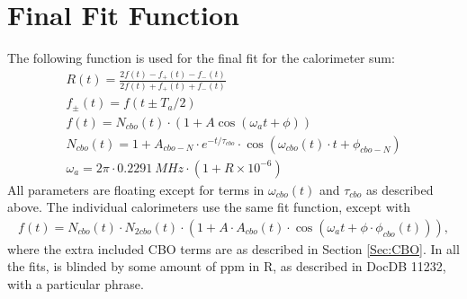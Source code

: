 \section{Final Fit Function}
\label{Sec:FinalFitFunction}

	The following function is used for the final fit for the calorimeter sum:
	\begin{gather}
			R(t) = \frac{2f(t) - f_{+}(t) - f_{-}(t)}{2f(t) + f_{+}(t) + f_{-}(t)} \\[10pt]
			f_{\pm}(t) = f(t \pm T_{a}/2) \\[10pt]
			f(t) = N_{cbo}(t) \cdot (1 + A \cos(\omega_{a}t + \phi)) \\[10pt]
			N_{cbo}(t) = 1 + A_{cbo-N} \cdot e^{-t/\tau_{cbo}} \cdot \cos(\omega_{cbo}(t) \cdot t + \phi_{cbo-N}) \\[10pt]
			\omega_{a} = 2 \pi \cdot \SI{0.2291}{MHz} \cdot (1 + R \times 10^{-6})
	\end{gather}
	All parameters are floating except for terms in $\omega_{cbo}(t)$ and $\tau_{cbo}$ as described above. The individual calorimeters use the same fit function, except with 
	\begin{gather}
			f(t) = N_{cbo}(t) \cdot N_{2cbo}(t) \cdot (1 + A \cdot A_{cbo}(t) \cdot \cos(\omega_{a}t + \phi \cdot \phi_{cbo}(t))),
	\end{gather}
	where the extra included CBO terms are as described in Section \ref{Sec:CBO}. In all the fits, \wa is blinded by some amount of ppm in R, as described in DocDB 11232, with a particular phrase.

